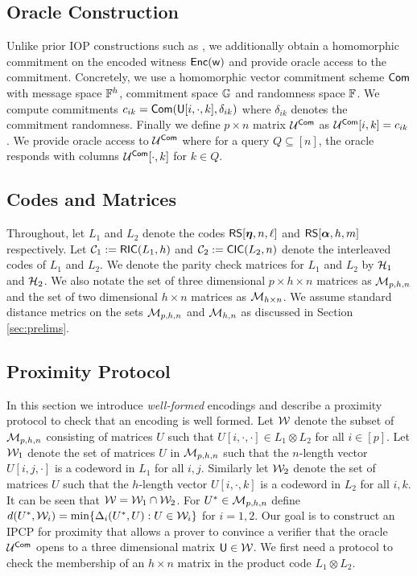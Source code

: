 \subsection{Oracle Construction}\label{sec:construct_oracle} 
Unlike prior IOP constructions such as \cite{ligero, aurora}, we additionally
obtain a homomorphic commitment on the encoded witness $\mathsf{Enc}(\mathsf{w})$ and provide
oracle access to the commitment. Concretely, we use a
homomorphic vector commitment scheme $\mathsf{Com}$ with message space $\mathbb{F}^h$,
commitment space $\mathbb{G}$ and randomness space $\mathbb{F}$. We compute commitments
$c_{ik}=\mathsf{Com}(\mathsf{U}[i,\cdot,k],\delta_{ik})$ where $\delta_{ik}$ denotes the
commitment randomness. Finally we define $p\times n$ matrix $\mathcal{U}^{\mathsf{Com}}$ as
$\mathcal{U}^{\mathsf{Com}}[i,k]=c_{ik}$. We provide oracle access to $\mathcal{U}^{\mathsf{Com}}$ where for a
query $Q\subseteq [n]$, the oracle responds with columns $\mathcal{U}^{\mathsf{Com}}[\cdot,k]$ for
$k\in Q$.

\subsection{Codes and Matrices}\label{sec:codesandmatrices}
Throughout, let $L_1$ and $L_2$ denote the codes $\mathsf{RS}[\bm{\eta},n,\ell]$ and
$\mathsf{RS}[\bm{\alpha},h,m]$ respectively. Let $\mathcal{C}_1 := \mathsf{RIC}(L_1,h)$ and $\mathcal{C}_2 :=
\mathsf{CIC}(L_2,n)$ denote the interleaved codes of $L_1$ and $L_2$. We denote the
parity check matrices for $L_1$ and $L_2$ by $\mathcal{H}_1$ and $\mathcal{H}_2$. We also
notate the set of three dimensional $p\times h\times n$ matrices as $\mathcal{M}_{p,h,n}$ and
the set of two dimensional $h\times n$ matrices as $\mathcal{M}_{h\times n}$. We
assume standard distance metrics on the sets $\mathcal{M}_{p,h,n}$ and $\mathcal{M}_{h,n}$
as discussed in Section \ref{sec:prelims}. 

\subsection{Proximity Protocol}\label{sec:proximityprotocols}
In this section we introduce {\em well-formed} encodings and
describe a proximity protocol to check that an encoding is well formed.
Let $\mathcal{W}$ denote the subset of $\mathcal{M}_{p,h,n}$
consisting of matrices $U$ such that $U[i,\cdot,\cdot]\in L_1\otimes L_2$ for all $i\in [p]$. 
Let $\mathcal{W}_1$ denote the set of matrices
$U$ in $\mathcal{M}_{p,h,n}$ such that the $n$-length vector $U[i,j,\cdot]$ is a
codeword in $L_1$ for all $i,j$. Similarly let $\mathcal{W}_2$ denote the set of
matrices $U$ such that the $h$-length vector $U[i,\cdot,k]$ is a codeword in
$L_2$ for all $i,k$. It can be seen that $\mathcal{W}=\mathcal{W}_1\cap \mathcal{W}_2$. For $U^\ast\in \mathcal{M}_{p,h,n}$ define
$d(U^\ast,\mathcal{W}_i)=\min\{\Delta_i(U^\ast,U):U\in \mathcal{W}_i\}$ for $i=1,2$.
Our goal is to construct an IPCP for proximity that allows a prover to convince a verifier that
the oracle $\mathcal{U}^{\mathsf{Com}}$ opens to a three dimensional matrix $\mathsf{U}\in \mathcal{W}$.
We first need a protocol to check the membership of an $h\times n$ matrix in the
product code $L_1\otimes L_2$.\smallskip


